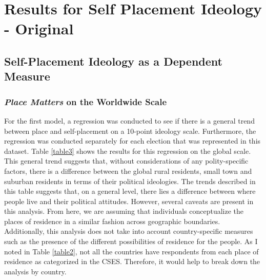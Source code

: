 \documentclass[12pt, titlepage]{article}
\title{\tb{Place of Residence and Political Attitudes in Democracies Worldwide \\ {\large Online Appendix A -- Original Results} }}
\author{Jennifer Lin}
\affil{New College of Florida}
\newcommand\e{\emph}
\begin{document}
\begin{singlespace}
\maketitle
\end{singlespace}

\section{Results for Self Placement Ideology - Original}

\subsection{Self-Placement Ideology as a Dependent Measure}

\subsubsection{\e{Place Matters} on the Worldwide Scale}

For the first model, a regression was conducted to see if there is a general trend between place and self-placement on a 10-point ideology scale. Furthermore, the regression was conducted separately for each election that was represented in this dataset. Table \ref{table3} shows the results for this regression on the global scale. This general trend suggests that, without considerations of any polity-specific factors, there is a difference between the global rural residents, small town and suburban residents in terms of their political ideologies. The trends described in this table suggests that, on a general level, there lies a difference between where people live and their political attitudes. However, several caveats are present in this analysis. From here, we are assuming that individuals conceptualize the places of residence in a similar fashion across geographic boundaries. Additionally, this analysis does not take into account country-specific measures such as the presence of the different possibilities of residence for the people. As I noted in Table \ref{table2}, not all the countries have respondents from each place of residence as categorized in the CSES. Therefore, it would help to break down the analysis by country.
\end{document}
